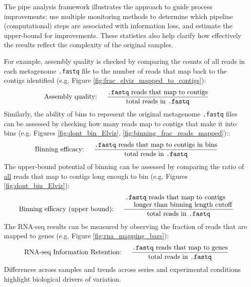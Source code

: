 The pipe analysis framework illustrates the approach to guide process improvements: use multiple monitoring methods to determine which pipeline (computational) steps are associated with information loss, and estimate the upper-bound for improvements.
These statistics also help clarify how effectively the results reflect the complexity of the original samples.

For example, assembly quality is checked by comparing the counts of all reads in each metagenome \texttt{.fastq} file to the number of reads that map back to the contigs identified (e.g. Figure \ref{fig:frac_elviz_mapped_to_contigs}):
\[\mbox{Assembly quality: } \quad \frac{\mbox{\texttt{.fastq} reads that map to contigs}}{\mbox{total reads in \texttt{.fastq}}}  \]
Similarly, the ability of bins to represent the original  metagenome \texttt{.fastq} files can be assessed by checking how many reads map to contigs that make it into bins (e.g. Figures \ref{fig:dont_bin_Elviz}, \ref{fig:binning_frac_reads_mapped})::
\[\mbox{Binning efficacy: } \quad \frac{\mbox{\texttt{.fastq} reads that map to contigs in bins}}{\mbox{total reads in \texttt{.fastq}}}  \]
The upper-bound potential of binning can be assessed by comparing the ratio of \underline{all} reads that map to contigs long enough to bin (e.g. Figures \ref{fig:dont_bin_Elviz}):
\[\mbox{Binning efficacy (upper bound): } \quad \frac{
	{\splitfrac{\mbox{\texttt{.fastq} reads that map to contigs}}{\mbox{longer than binning length cutoff}}}}
	{\mbox{total reads in \texttt{.fastq}}}  \]
The RNA-seq results can be measured by observing the fraction of reads that are mapped to genes (e.g. Figure \ref{fig:rna_mapping_bars}):
\[\mbox{RNA-seq Information Retention: } \quad \frac{
	\mbox{\texttt{.fastq} reads that map to genes}}
	{\mbox{total reads in \texttt{.fastq}}}  \]
Differences across samples and trends across series and experimental conditions highlight biological drivers of variation.


